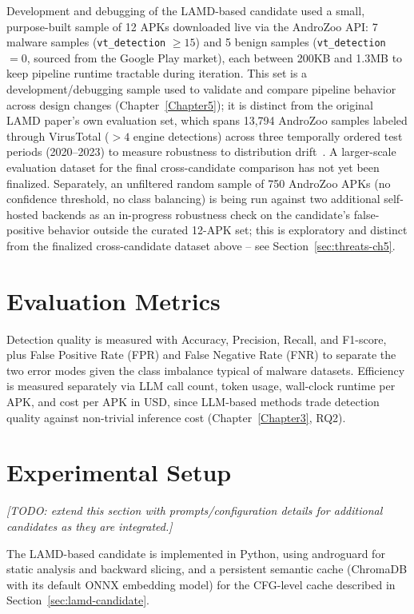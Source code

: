 Development and debugging of the LAMD-based candidate used a small,
purpose-built sample of 12 APKs downloaded live via the AndroZoo API: 7
malware samples (\texttt{vt\_detection} $\geq 15$) and 5 benign samples
(\texttt{vt\_detection} $= 0$, sourced from the Google Play market), each
between 200KB and 1.3MB to keep pipeline runtime tractable during
iteration. This set is a development/debugging sample used to validate and
compare pipeline behavior across design changes (Chapter~\ref{Chapter5}); it
is distinct from the original LAMD paper's own evaluation set, which spans
13,794 AndroZoo samples labeled through VirusTotal ($>4$ engine detections)
across three temporally ordered test periods (2020--2023) to measure
robustness to distribution drift~\cite{Qian2025-ua}. A larger-scale
evaluation dataset for the final cross-candidate comparison has not yet
been finalized. Separately, an unfiltered random sample of 750 AndroZoo
APKs (no confidence threshold, no class balancing) is being run against two
additional self-hosted backends as an in-progress robustness check on the
candidate's false-positive behavior outside the curated 12-APK set; this is
exploratory and distinct from the finalized cross-candidate dataset above --
see Section~\ref{sec:threats-ch5}.

\section{Evaluation Metrics}\label{sec:metrics}

Detection quality is measured with Accuracy, Precision, Recall, and
F1-score, plus False Positive Rate (FPR) and False Negative Rate (FNR) to
separate the two error modes given the class imbalance typical of malware
datasets. Efficiency is measured separately via LLM call count, token usage,
wall-clock runtime per APK, and cost per APK in USD, since LLM-based methods
trade detection quality against non-trivial inference cost
(Chapter~\ref{Chapter3}, RQ2).

\section{Experimental Setup}

\textit{[TODO: extend this section with prompts/configuration details for
additional candidates as they are integrated.]}

The LAMD-based candidate is implemented in Python, using androguard for
static analysis and backward slicing, and a persistent semantic cache
(ChromaDB with its default ONNX embedding model) for the CFG-level cache
described in Section~\ref{sec:lamd-candidate}.

